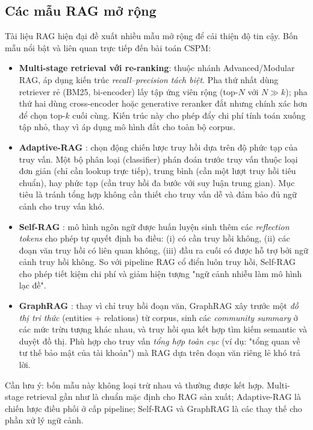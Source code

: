 \subsection{Các mẫu RAG mở rộng}
\label{subsec:rag-2024}

Tài liệu RAG hiện đại đề xuất nhiều mẫu mở rộng để cải thiện độ tin cậy. Bốn mẫu nổi bật và liên quan trực tiếp đến bài toán CSPM:

\begin{itemize}
  \item \textbf{Multi-stage retrieval với re-ranking}: thuộc nhánh Advanced/Modular RAG, áp dụng kiến trúc \textit{recall--precision tách biệt}. Pha thứ nhất dùng retriever rẻ (BM25, bi-encoder) lấy tập ứng viên rộng (top-$N$ với $N \gg k$); pha thứ hai dùng cross-encoder hoặc generative reranker đắt nhưng chính xác hơn để chọn top-$k$ cuối cùng. Kiến trúc này cho phép đẩy chi phí tính toán xuống tập nhỏ, thay vì áp dụng mô hình đắt cho toàn bộ corpus.
  \item \textbf{Adaptive-RAG} \cite{jeong_adaptiverag_2024}: chọn động chiến lược truy hồi dựa trên độ phức tạp của truy vấn. Một bộ phân loại (classifier) phán đoán trước truy vấn thuộc loại đơn giản (chỉ cần lookup trực tiếp), trung bình (cần một lượt truy hồi tiêu chuẩn), hay phức tạp (cần truy hồi đa bước với suy luận trung gian). Mục tiêu là tránh tổng hợp không cần thiết cho truy vấn dễ và đảm bảo đủ ngữ cảnh cho truy vấn khó.
  \item \textbf{Self-RAG} \cite{asai_selfrag_2024}: mô hình ngôn ngữ được huấn luyện sinh thêm các \textit{reflection tokens} cho phép tự quyết định ba điều: (i) có cần truy hồi không, (ii) các đoạn văn truy hồi có liên quan không, (iii) đầu ra cuối có được hỗ trợ bởi ngữ cảnh truy hồi không. So với pipeline RAG cổ điển luôn truy hồi, Self-RAG cho phép tiết kiệm chi phí và giảm hiện tượng "ngữ cảnh nhiễu làm mô hình lạc đề".
  \item \textbf{GraphRAG} \cite{edge_graphrag_2024}: thay vì chỉ truy hồi đoạn văn, GraphRAG xây trước một \textit{đồ thị tri thức} (entities + relations) từ corpus, sinh các \textit{community summary} ở các mức trừu tượng khác nhau, và truy hồi qua kết hợp tìm kiếm semantic và duyệt đồ thị. Phù hợp cho truy vấn \textit{tổng hợp toàn cục} (ví dụ: "tổng quan về tư thế bảo mật của tài khoản") mà RAG dựa trên đoạn văn riêng lẻ khó trả lời.
\end{itemize}

Cần lưu ý: bốn mẫu này không loại trừ nhau và thường được kết hợp. Multi-stage retrieval gần như là chuẩn mặc định cho RAG sản xuất; Adaptive-RAG là chiến lược điều phối ở cấp pipeline; Self-RAG và GraphRAG là các thay thế cho phần xử lý ngữ cảnh.

